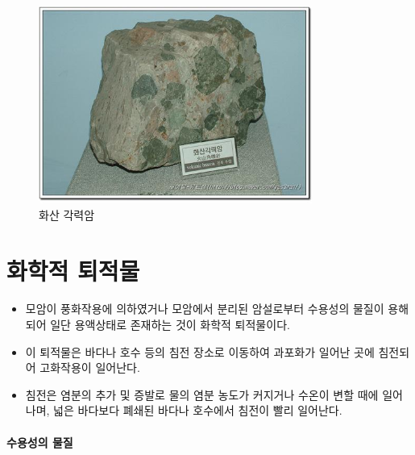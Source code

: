 \documentclass[12pt, a4paper, twoside]{book}
\begin{document}
				\begin{figure}[h]
				\centering
				\caption{화산 각력암}
				\includegraphics[width=0.8\textwidth]{./fig/SedimentaryRock_0004.jpg}
				\end{figure}



				
	\clearpage
	\section{화학적 퇴적물}

			\begin{itemize}[	topsep=0.0em, itemsep=0.0em, leftmargin=4em, labelsep=3em ] 
			\item	모암이 풍화작용에 의하였거나 모암에서 분리된 암설로부터 수용성의 물질이 용해되어 일단 용액상태로 존재하는 것이 화학적 퇴적물이다.
			\item	이 퇴적물은 바다나 호수 등의 침전 장소로 이동하여 과포화가 일어난 곳에 침전되어 고화작용이 일어난다.
			\item	침전은 염분의 추가 및 증발로 물의 염분 농도가 커지거나 수온이 변할 때에 일어나며, 
					넓은 바다보다 폐쇄된 바다나 호수에서 침전이 빨리 일어난다.
			\end{itemize}	

		\paragraph{수용성의 물질}
			
		







	\clearpage
\end{document}
